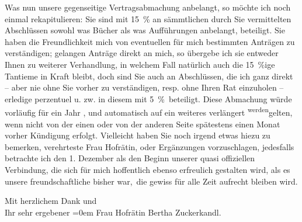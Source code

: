 \pstart
           Was nun unsere gegenseitige Vertragsabmachung anbelangt, so möchte ich noch einmal
               rekapitulieren: Sie sind mit 15 {\%} an sämmtlichen durch Sie
               vermittelten Abschlüssen sowohl was Bücher als was Aufführungen anbelangt, beteiligt.
               Sie haben die Freundlichkeit mich von eventuellen für mich bestimmten Anträgen zu
               verständigen; gelangen Anträge direkt an mich, so übergebe ich sie entweder Ihnen zu
               weiterer Verhandlung, in welchem Fall natürlich auch die 15 {\%}ige Tantieme in Kraft bleibt, doch sind Sie auch an Abschlüssen, die ich ganz
               direkt – aber nie ohne Sie vorher zu verständigen, resp. ohne Ihren Rat einzuholen –
               erledige perzentuel u. zw. in diesem mit 5 {\%} beteiligt. Diese
               Abmachung würde vorläufig für ein Jahr , und automatisch auf ein weiteres verlängert \substVorne{}\textsuperscript{werden}\substDazwischen{}gelten\substHinten{},
               wenn nicht von der einen oder von der anderen Seite spätestens einen Monat vorher
               Kündigung erfolgt. Vielleicht haben Sie noch irgend etwas hiezu zu bemerken,
               verehrteste Frau Hofrätin, oder Ergänzungen vorzuschlagen, jedesfalls betrachte ich
               den 1. Dezember als den Beginn unserer quasi offiziellen Verbindung, die
               sich für mich hoffentlich ebenso erfreulich gestalten wird, als es unsere
               freundschaftliche bisher war, die gewiss für alle Zeit aufrecht bleiben wird.\pend
           
\pstart
           Mit herzlichem Dank und \label{T_L03949-1v}\label{T_L03949-1}{\\[\baselineskip]}Ihr sehr ergebener\pend
           \leftskip=0em{}{\vspace{1\baselineskip}}
\pstart
           \noindent{}Frau Hofrätin Bertha Zuckerkandl.\pend
           \endnumbering{}
\begin{anhang}
\end{anhang}\newcommand{\dateiname}{L03949}\newcommand{\titel}{Arthur Schnitzler an Berta Zuckerkandl, 1. 12. 1923}\newcommand{\editorInnen}{Herausgegeben von Jahnke, SelmaMüller, Martin Anton}
